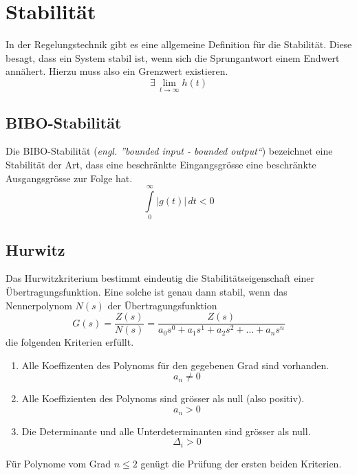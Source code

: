 \section{Stabilität}
In der Regelungstechnik gibt es eine allgemeine Definition für die
Stabilität. Diese besagt, dass ein System stabil ist, wenn sich die
Sprungantwort einem Endwert annähert. Hierzu muss also ein Grenzwert
existieren.
\[ 
    \exists\, \lim_{t \rightarrow \infty} h(t)
\]

\subsection{BIBO-Stabilität}
Die BIBO-Stabilität (\textit{engl. ''bounded input - bounded output``}) 
bezeichnet eine Stabilität der Art, dass eine beschränkte Eingangsgrösse 
eine beschränkte Ausgangsgrösse zur Folge hat. 
\[  
    \int\limits_{0}^{\infty} \lvert g(t) \rvert \, dt < 0
\]

\subsection{Hurwitz}
Das Hurwitzkriterium bestimmt eindeutig die Stabilitätseigenschaft einer
Übertragungsfunktion. Eine solche ist genau dann stabil, wenn das 
Nennerpolynom $N(s)$ der Übertragungsfunktion 
\[  
    G(s) 
        = \frac{Z(s)}{N(s)} 
        = \frac{Z(s)}{a_0s^0 + a_1s^1 + a_2s^2 + \dots + a_ns^n} 
\]
die folgenden Kriterien erfüllt.
%
\begin{enumerate}
    \item Alle Koeffizenten des Polynoms für den gegebenen Grad sind 
        vorhanden. \[ a_n \neq 0 \]
    \item Alle Koeffizienten des Polynoms sind grösser als null (also
        positiv). \[ a_n > 0 \]
    \item Die Determinante und alle Unterdeterminanten sind grösser 
        als null. \[ \Delta_i > 0 \]
\end{enumerate}
%
Für Polynome vom Grad $n \leq 2$ genügt die Prüfung der ersten beiden 
Kriterien.

